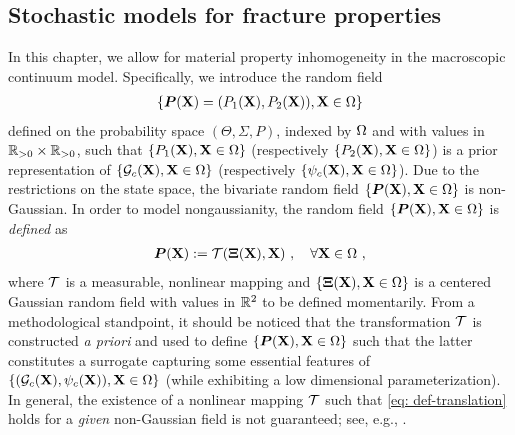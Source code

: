 \subsection{Stochastic models for fracture properties}
\label{section: Chapter4/theory/stochastic}

In this chapter, we allow for material property inhomogeneity in the macroscopic continuum model. Specifically, we introduce the random field
\begin{align}
  \{\boldsymbol{P}(\textbf{X}) = (P_1(\textbf{X}), P_2(\textbf{X})), \textbf{X} \in \Omega\}
\end{align}
defined on the probability space $(\Theta, \Sigma, P)$, indexed by $\Omega$ and with values in $\mathbb{R}_{>0} \times \mathbb{R}_{>0}$, such that $\{P_1(\textbf{X}), \textbf{X} \in \Omega\}$
(respectively $\{P_2(\textbf{X}), \textbf{X} \in \Omega\}$) is a prior representation of $\{{\mathcal{G}_c}(\textbf{X}), \textbf{X} \in \Omega\}$ (respectively $\{\psi_c(\textbf{X}), \textbf{X} \in \Omega\}$).
Due to the restrictions on the state space, the bivariate random field $\{\boldsymbol{P}(\textbf{X}), \textbf{X} \in \Omega\}$ is non-Gaussian. In order to model nongaussianity, the random field $\{\boldsymbol{P}(\textbf{X}), \textbf{X} \in \Omega\}$ is \textit{defined} as
\begin{align}
  \boldsymbol{P}(\textbf{X}) := \mathcal{T}(\boldsymbol{\Xi}(\textbf{X}), \textbf{X})~, \quad \forall \textbf{X} \in \Omega~, \label{eq: def-translation}
\end{align}
where $\mathcal{T}$ is a measurable, nonlinear mapping and $\{\boldsymbol{\Xi}(\textbf{X}),\textbf{X} \in \Omega\}$ is a centered Gaussian random field with values in $\mathbb{R}^2$ to be defined momentarily. From a methodological standpoint, it should be noticed that the transformation $\mathcal{T}$ is constructed \textit{a priori} and used to define $\{\boldsymbol{P}(\textbf{X}), \textbf{X} \in \Omega\}$ such that the latter constitutes a surrogate capturing some essential features of $\{({\mathcal{G}_c}(\textbf{X}),\psi_c(\textbf{X})), \textbf{X} \in \Omega\}$
(while exhibiting a low dimensional parameterization). In general, the existence of a nonlinear mapping $\mathcal{T}$ such that \eqref{eq: def-translation} holds for a \textit{given} non-Gaussian field is not guaranteed; see, e.g., \cite{Grigoriu2009}.

